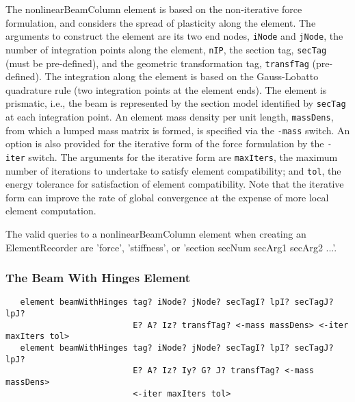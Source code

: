 \documentclass[12pt]{article}
\begin{document}
\noindent The nonlinearBeamColumn element is based on the
non-iterative force formulation, and considers the spread of
plasticity along the element. The arguments to construct the element
are its two end nodes, {\tt iNode} and {\tt jNode}, the number of
integration points along the element, {\tt nIP}, the section tag,
{\tt secTag} (must be pre-defined), and the geometric transformation tag,
{\tt transfTag} (pre-defined). The integration along the element is
based on the
Gauss-Lobatto quadrature rule (two integration points at the element
ends). The element is prismatic, i.e., the beam is represented by the
section model identified by {\tt secTag} at each integration point. An
element mass density per unit length, {\tt massDens}, from which a lumped
mass matrix is formed, is specified via the {\tt -mass} switch. An option is
also provided for the iterative form of the force formulation by
the {\tt -iter} switch. The arguments for the iterative form are
{\tt maxIters}, the maximum number of iterations to undertake to
satisfy element compatibility; and {\tt tol}, the energy tolerance for
satisfaction of element compatibility.
Note that the iterative form can improve the rate of
global convergence at the expense of more local element computation. 

The valid queries to a nonlinearBeamColumn element when creating an
ElementRecorder are 'force', 'stiffness', or 'section secNum secArg1 secArg2 ...'.

\subsubsection{The Beam With Hinges Element}
{\sf\small
\begin{verbatim}
   element beamWithHinges tag? iNode? jNode? secTagI? lpI? secTagJ? lpJ?
                          E? A? Iz? transfTag? <-mass massDens> <-iter maxIters tol> 
   element beamWithHinges tag? iNode? jNode? secTagI? lpI? secTagJ? lpJ?
                          E? A? Iz? Iy? G? J? transfTag? <-mass massDens>
                          <-iter maxIters tol> 
\end{verbatim}
}
\end{document}
